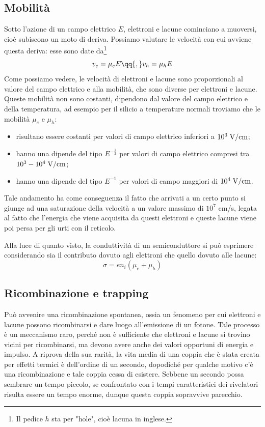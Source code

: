\subsection{Mobilità}
Sotto l'azione di un campo elettrico $E$, elettroni e lacune cominciano a muoversi, cioè subiscono un moto di deriva. Possiamo valutare le velocità con cui avviene questa deriva: esse sono date da\footnote{Il pedice $h$ sta per "hole", cioè lacuna in inglese.}
\begin{equation*}
   v_e=\mu_e E
   \qq{,}
   v_h=\mu_h E
\end{equation*}
Come possiamo vedere, le velocità di elettroni e lacune sono proporzionali al valore del campo elettrico e alla mobilità, che sono diverse per elettroni e lacune. Queste mobilità non sono costanti, dipendono dal valore del campo elettrico e della temperatura, ad esempio per il silicio a temperature normali troviamo che le mobilità $\mu_e$ e $\mu_h$:
\begin{itemize}[leftmargin=0.5cm]
   \item risultano essere costanti per valori di campo elettrico inferiori a $10^3 \; \rm V/cm$;
   \item hanno una dipende del tipo $E^{-\frac{1}{2}}$ per valori di campo elettrico compresi tra $10^3-10^4 \; \rm V/cm$;
   \item hanno una dipende del tipo $E^{-1}$ per valori di campo maggiori di $10^4 \; \rm V/cm$.
\end{itemize}
Tale andamento ha come conseguenza il fatto che arrivati a un certo punto si giunge ad una saturazione della velocità a un valore massimo di $10^7$ cm/s, legata al fatto che l'energia che viene acquisita da questi elettroni e queste lacune viene poi persa per gli urti con il reticolo.

Alla luce di quanto visto, la conduttività di un semiconduttore si può esprimere considerando sia il contributo dovuto agli elettroni che quello dovuto alle lacune:
\begin{equation*}
   \sigma=e n_i (\mu_e + \mu_h)
\end{equation*}
\subsection{Ricombinazione e trapping}

Può avvenire una ricombinazione spontanea, ossia un fenomeno per cui elettroni e lacune possono ricombinarsi e dare luogo all'emissione di un fotone. Tale processo è un meccanismo raro, perché non è sufficiente che elettroni e lacune si trovino vicini per ricombinarsi, ma devono avere anche dei valori opportuni di energia e impulso. A riprova della sua rarità, la vita media di una coppia che è stata creata per effetti termici è dell'ordine di un secondo, dopodiché per qualche motivo c'è una ricombinazione e tale coppia cessa di esistere. Sebbene un secondo possa sembrare un tempo piccolo, se confrontato con i tempi caratteristici dei rivelatori risulta essere un tempo enorme, dunque questa coppia sopravvive parecchio.

